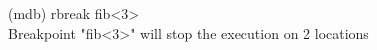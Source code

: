 
\begin{tttenv}
(mdb) rbreak fib<3> \\
Breakpoint "fib<3>" will stop the execution on 2 locations
\end{tttenv}
